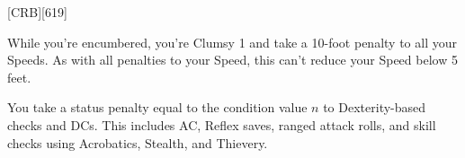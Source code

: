 
[CRB][619]



While you're encumbered, you're Clumsy 1 and take a 10-foot penalty to all your Speeds.
As with all penalties to your Speed, this can't reduce your Speed below 5 feet.



You take a status penalty equal to the condition value \(n\) to Dexterity-based checks and DCs.
This includes AC, Reflex saves, ranged attack rolls, and skill checks using Acrobatics, Stealth, and Thievery.

